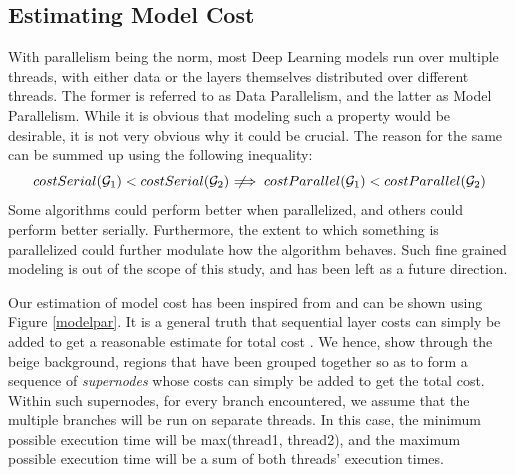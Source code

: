 \documentclass[12pt,a4paper,twoside,openright,bibliography=totocnumbered]{report}
\newcommand{\notimplies}{\;\not\!\!\!\implies}
\begin{document}
    \subsection{Estimating Model Cost}
    With parallelism being the norm, most Deep Learning models run over multiple threads, with either data or the layers themselves distributed over different threads. The former is referred to as Data Parallelism, and the latter as Model Parallelism. While it is obvious that modeling such a property would be desirable, it is not very obvious why it could be crucial. The reason for the same can be summed up using the following inequality:
    \begin{equation}
        costSerial(\mathcal{G}_1) < costSerial(\mathcal{G}_2) \notimplies costParallel(\mathcal{G}_1) < costParallel(\mathcal{G}_2)
        \label{modelCostDilemma}
    \end{equation}
    Some algorithms could perform better when parallelized, and others could perform better serially. Furthermore, the extent to which something is parallelized could further modulate how the algorithm behaves. Such fine grained modeling is out of the scope of this study, and has been left as a future direction.

    Our estimation of model cost has been inspired from \cite{qi2017paleo} and can be shown using Figure \ref{modelpar}. It is a general truth that sequential layer costs can simply be added to get a reasonable estimate for total cost \cite{osterwind2022hardware}. We hence, show through the beige background, regions that have been grouped together so as to form a sequence of \textit{supernodes} whose costs can simply be added to get the total cost. Within such supernodes, for every branch encountered, we assume that the multiple branches will be run on separate threads. In this case, the minimum possible execution time will be max(thread1, thread2), and the maximum possible execution time will be a sum of both threads' execution times. 
    
\end{document}
